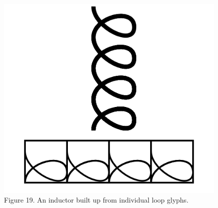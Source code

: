 \documentclass[11pt]{article}
\begin{document}
\begin{figure}
    
\includegraphics[width=\linewidth]{figures/figure19_inductor.png}

\caption{Figure 19. An inductor built up from individual loop glyphs.}
\end{figure}
\end{document}
